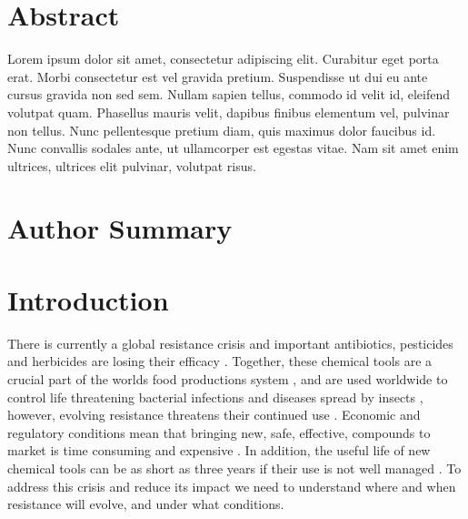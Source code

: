 \documentclass[10pt,letterpaper]{article}
\begin{document}
\section*{Abstract}
Lorem ipsum dolor sit amet, consectetur adipiscing elit. Curabitur eget porta erat. Morbi consectetur est vel gravida pretium. Suspendisse ut dui eu ante cursus gravida non sed sem. Nullam sapien tellus, commodo id velit id, eleifend volutpat quam. Phasellus mauris velit, dapibus finibus elementum vel, pulvinar non tellus. Nunc pellentesque pretium diam, quis maximus dolor faucibus id. Nunc convallis sodales ante, ut ullamcorper est egestas vitae. Nam sit amet enim ultrices, ultrices elit pulvinar, volutpat risus.


\section*{Author Summary}

\linenumbers

\section*{Introduction}
There is currently a global resistance crisis \cite{Serv2013, Ross2014} and important antibiotics, pesticides and herbicides are losing their efficacy \cite{Palu2001}. Together, these chemical tools are a crucial part of the worlds food productions system \cite{Duke2012}, and are used worldwide to control life threatening bacterial infections and diseases spread by insects \cite{Nkya2013}, however, evolving resistance threatens their continued use \cite{Barb2011, Nkya2013}. Economic and regulatory conditions mean that bringing new, safe, effective, compounds to market is time consuming and expensive \cite{Duke2012}. In addition, the useful life of new chemical tools can be as short as three years if their use is not well managed \cite{Palu2001, Duke2012}. To address this crisis and reduce its impact we need to understand where and when resistance will evolve, and under what conditions. 
\end{document}
